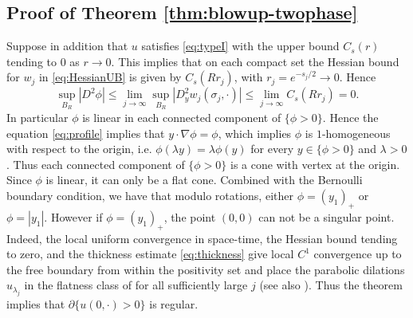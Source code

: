 \documentclass[11pt]{article}
\numberwithin{equation}{section}
\theoremstyle{definition}
\begin{document}
\subsection{Proof of Theorem \ref{thm:blowup-twophase}}

Suppose in addition that $u$ satisfies \eqref{eq:typeI} with the upper bound $C_s(r)$ tending to $0$ as $r\to 0$. This implies that on each compact set the Hessian bound for $w_j$ in \eqref{eq:HessianUB} is given by $C_s(R r_j)$, with $r_j = e^{-s_j/2} \to 0$. Hence
\[ \sup_{B_R} |D^2\phi| \leq \lim_{j\to \infty} \sup_{B_R} |D^2_y w_j(\sigma_j, \cdot)| \leq \lim_{j\to \infty} C_s(R r_j) = 0. \]
In particular $\phi$ is linear in each connected component of $\{\phi>0\}$. Hence the equation \eqref{eq:profile} implies that $y\cdot \nabla \phi = \phi$, which implies $\phi$ is $1$-homogeneous with respect to the origin, i.e. $\phi(\lambda y) = \lambda \phi(y)$ for every $y\in \{\phi>0\}$ and $\lambda>0$. Thus each connected component of $\{\phi>0\}$ is a cone with vertex at the origin. Since $\phi$ is linear, it can only be a flat cone. Combined with the Bernoulli boundary condition, we have that modulo rotations, either $\phi= (y_1)_+$ or $\phi=|y_1|$. However if $\phi=(y_1)_+$, the point $(0,0)$ can not be a singular point. Indeed, the local uniform convergence in space-time, the Hessian bound tending to zero, and the thickness estimate \eqref{eq:thickness} give local $C^1$ convergence up to the free boundary from within the positivity set and place the parabolic dilations $u_{\lambda_j}$ in the flatness class of \cite[Theorem 8.4]{AW} for all sufficiently large $j$ (see also \cite[Theorem 8.1]{AC}). Thus the theorem implies that $\partial\{u(0,\cdot)>0\}$ is regular. 
\end{document}
